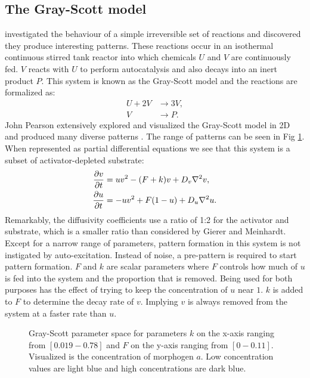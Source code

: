 \subsection{The Gray-Scott model}
\citet{Gray1984} investigated the behaviour of a simple irreversible set of reactions and discovered they produce interesting patterns. These reactions occur in an isothermal continuous stirred tank reactor into which chemicals $U$ and $V$ are continuously fed. $V$ reacts with $U$ to perform autocatalysis and also decays into an inert product $P$. This system is known as the Gray-Scott model and the reactions are formalized as:
	\begin{equation}
	\begin{aligned}
	U + 2V &\to 3V, \\
	V &\to P.
	\end{aligned}
	\end{equation}
John Pearson extensively explored and visualized the Gray-Scott model in 2D and produced many diverse patterns \citep{pearson1993}. The range of patterns can be seen in Fig \ref{fig:grayscottParameterMap}. When represented as partial differential equations we see that this system is a subset of activator-depleted substrate:
	\begin{equation}
	\begin{aligned} \label{eq:grayscottRD}
	\frac{\partial v}{\partial t} &= uv^2 - (F+k)v + D_v \nabla^2 v,\\
	\frac{\partial u}{\partial t} &= -uv^2 + F(1-u) + D_u \nabla^2 u.
	\end{aligned}
	\end{equation}
Remarkably, the diffusivity coefficients use a ratio of 1:2 for the activator and substrate, which is a smaller ratio than considered by Gierer and Meinhardt. Except for a narrow range of parameters, pattern formation in this system is not instigated by auto-excitation. Instead of noise, a pre-pattern is required to start pattern formation. $F$ and $k$ are scalar parameters where $F$ controls how much of $u$ is fed into the system and the proportion that is removed. Being used for both purposes has the effect of trying to keep the concentration of $u$ near $1$. $k$ is added to $F$ to determine the decay rate of $v$. Implying $v$ is always removed from the system at a faster rate than $u$.

\begin{figure}[H]
	\centering
	\caption{Gray-Scott parameter space for parameters $k$ on the x-axis ranging from $[0.019 - 0.78]$ and $F$ on the y-axis ranging from $[0 - 0.11]$. Visualized is the concentration of morphogen $a$. Low concentration values are light blue and high concentrations are dark blue.}
	\label{fig:grayscottParameterMap}
\end{figure}

